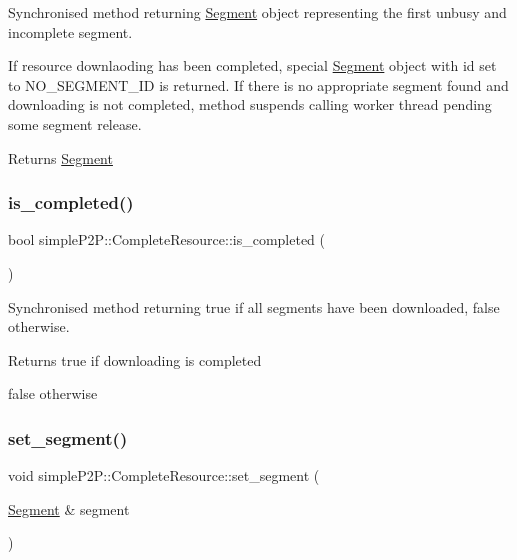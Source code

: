 Synchronised method returning \hyperlink{classsimpleP2P_1_1Segment}{Segment} object representing the first unbusy and incomplete segment. 

If resource downlaoding has been completed, special \hyperlink{classsimpleP2P_1_1Segment}{Segment} object with id set to N\+O\+\_\+\+S\+E\+G\+M\+E\+N\+T\+\_\+\+ID is returned. If there is no appropriate segment found and downloading is not completed, method suspends calling worker thread pending some segment release.

\begin{DoxyReturn}{Returns}
\hyperlink{classsimpleP2P_1_1Segment}{Segment} 
\end{DoxyReturn}
\mbox{\label{classsimpleP2P_1_1CompleteResource_aaa20fce1d1d3fbd3f616debaedcaf7a3}} 
\subsubsection{\texorpdfstring{is\+\_\+completed()}{is\_completed()}}
{\footnotesize\ttfamily bool simple\+P2\+P\+::\+Complete\+Resource\+::is\+\_\+completed (\begin{DoxyParamCaption}{ }\end{DoxyParamCaption})}



Synchronised method returning true if all segments have been downloaded, false otherwise. 

\begin{DoxyReturn}{Returns}
true if downloading is completed 

false otherwise 
\end{DoxyReturn}
\mbox{\label{classsimpleP2P_1_1CompleteResource_a52ddae2486fb593cc315247af38014e7}} 
\subsubsection{\texorpdfstring{set\+\_\+segment()}{set\_segment()}}
{\footnotesize\ttfamily void simple\+P2\+P\+::\+Complete\+Resource\+::set\+\_\+segment (\begin{DoxyParamCaption}\item[{\hyperlink{classsimpleP2P_1_1Segment}{Segment} \&}]{segment }\end{DoxyParamCaption})}



